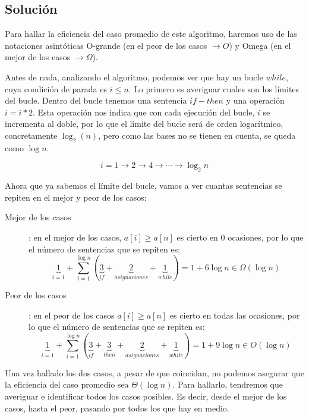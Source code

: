 \documentclass[10pt,a4paper,spanish]{report}
\begin{document}
\subsection{\textcolor[rgb]{0.1,0.2,1}Solución}

Para hallar la eficiencia del caso promedio de este algoritmo, haremos uso de las notaciones asintóticas O-grande (en el peor de los casos $\rightarrow O$) y Omega (en el mejor de los casos $\rightarrow \Omega$).

Antes de nada, analizando el algoritmo, podemos ver que hay un bucle $while$, cuya condición de parada es $i \le n$. Lo primero es averiguar cuales son los límites del bucle. Dentro del bucle tenemos una sentencia $if-then$ y una operación $i = i * 2$. Esta operación nos indica que con cada ejecución del bucle, $i$ se incrementa al doble, por lo que el límite del bucle será de orden logarítmico, concretamente $\log_2(n)$, pero como las bases no se tienen en cuenta, se queda como $\log n$.

\begin{displaymath}
  i = 1 \rightarrow 2 \rightarrow 4 \rightarrow \cdots \rightarrow \log_2 n
\end{displaymath}

Ahora que ya sabemos el límite del bucle, vamos a ver cuantas sentencias se repiten en el mejor y peor de los casos:

\begin{description}
  \item [Mejor de los casos]: en el mejor de los casos, $a[i] \ge a[n]$ es cierto en 0 ocasiones, por lo que el número de sentencias que se repiten es:
  \begin{displaymath}
    \underbrace{1}_{i = 1} + \sum_{i = 1}^{\log n} (\underbrace{3}_{if} + \underbrace{2}_{asignaciones} + \underbrace{1}_{while}) = 1 + 6\log n \in \Omega(\log n)
  \end{displaymath}
  \item [Peor de los casos]: en el peor de los casos $a[i] \ge a[n]$ es cierto en todas las ocasiones, por lo que el número de sentencias que se repiten es:
  \begin{displaymath}
    \underbrace{1}_{i = 1} + \sum_{i = 1}^{\log n} (\underbrace{3}_{if} + \underbrace{3}_{then} + \underbrace{2}_{asignaciones} + \underbrace{1}_{while}) = 1 + 9\log n \in O(\log n)
  \end{displaymath}
\end{description}

Una vez hallado los dos casos, a pesar de que coincidan, no podemos asegurar que la eficiencia del caso promedio sea $\Theta(\log n)$. Para hallarlo, tendremos que averiguar e identificar todos los casos posibles. Es decir, desde el mejor de los casos, hasta el peor, pasando por todos los que hay en medio.
\end{document}
